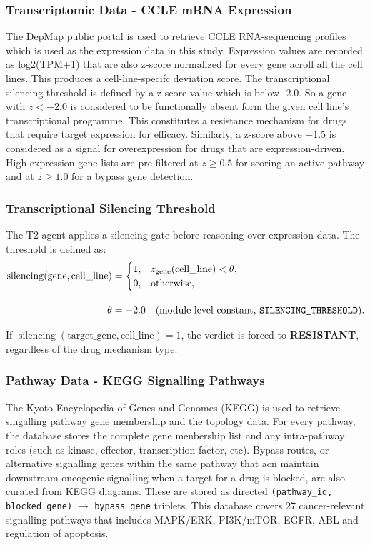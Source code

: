 \documentclass{article}
\begin{document}
\subsubsection{Transcriptomic Data - CCLE mRNA Expression}%
The DepMap public portal \cite{barretina2012cancer} is used to retrieve CCLE RNA-sequencing profiles which is used as the expression data in this study. Expression values are recorded as log2(TPM+1) that are also z-score normalized for every gene acroll all the cell lines. This produces a cell-line-specifc deviation score. The transcriptional silencing threshold is defined by a z-score value which is below -2.0. So a gene with $z < -2.0$ is considered to be functionally absent form the given cell line's transcriptional programme. This constitutes a resistance mechanism for drugs that require target expression for efficacy. Similarly, a z-score above +1.5 is considered as a signal for overexpression for drugs that are expression-driven. High-expression gene lists are pre-filtered at $z \geq 0.5$ for scoring an active pathway and at $z \geq 1.0$ for a bypass gene detection. 

\subsubsection{Transcriptional Silencing Threshold}
The T2 agent applies a silencing gate before reasoning over expression data. The threshold is defined as:
\begin{align*}
\operatorname{silencing}(\text{gene}, \text{cell\_line})
&=
\begin{cases}
1, & z_{\text{gene}}(\text{cell\_line}) < \theta,\\
0, & \text{otherwise},
\end{cases}
\\[1em]
\theta &= -2.0
\quad \text{(module-level constant, \texttt{SILENCING\_THRESHOLD})}.
\end{align*}

\noindent
If $\operatorname{silencing}(\text{target\_gene},\text{cell\_line})=1$,
the verdict is forced to \textbf{RESISTANT}, regardless of the drug
mechanism type.

\subsubsection{Pathway Data - KEGG Signalling Pathways} 
The Kyoto Encyclopedia of Genes and Genomes (KEGG) \cite{kanehisa2000kegg} is used to retrieve singalling pathway gene membership and the topology data. For every pathway, the database stores the complete gene menbership list and any intra-pathway roles (such as kinase, effector, transcription factor, etc). Bypass routes, or alternative signalling genes within the same pathway that acn maintain downstream oncogenic signalling when a target for a drug is blocked, are also curated from KEGG diagrams. These are stored as directed \texttt{(pathway\_id, blocked\_gene)} $\rightarrow$ \texttt{bypass\_gene} triplets. This database covers 27 cancer-relevant signalling pathways that includes MAPK/ERK, PI3K/mTOR, EGFR, ABL and regulation of apoptosis. 
\end{document}
